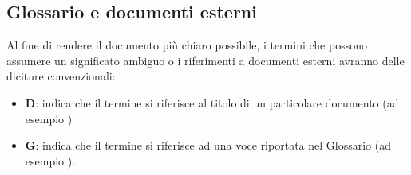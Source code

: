 \subsection{Glossario e documenti esterni}
Al fine di rendere il documento più chiaro possibile, i termini che possono assumere un significato ambiguo o i riferimenti a documenti esterni
avranno delle diciture convenzionali:

\begin{itemize}
    \item \textbf{D}: indica che il termine si riferisce al titolo di un particolare documento (ad esempio \PdPd)
    \item \textbf{G}: indica che il termine si riferisce ad una voce riportata nel Glossario (ad esempio ).
\end{itemize}
